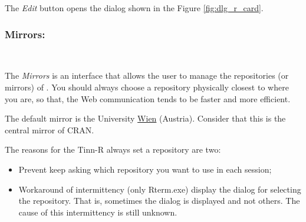 The \textit{Edit} button opens the dialog shown in the Figure \ref{fig:dlg_r_card}.


\subsubsection{Mirrors:}\\

The \textit{Mirrors} is an interface that allows the user to manage the repositories (or mirrors) of \RR{}.
You should always choose a repository physically closest to where you are,
so that, the Web communication tends to be faster and more efficient.

The default mirror is the University \href{http://cran.at.r-project.org/}{Wien}
(Austria). Consider that this is the central mirror of CRAN.

The reasons for the Tinn-R always set a repository are two:
\begin {itemize}
   \item Prevent \RR{} keep asking which repository you want to use in each session;
   \item Workaround of intermittency (only Rterm.exe) display the dialog for selecting the repository.
    That is, sometimes the dialog is displayed and not others. The cause of this intermittency is still unknown.
\end {itemize}

